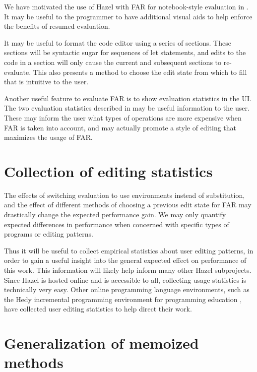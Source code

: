 We have motivated the use of Hazel with FAR for notebook-style evaluation in . It may be useful to the programmer to have additional visual aids to help enforce the benefits of resumed evaluation.

It may be useful to format the code editor using a series of sections. These sections will be syntactic sugar for sequences of let statements, and edits to the code in a section will only cause the current and subsequent sections to re-evaluate. This also presents a method to choose the edit state from which to fill that is intuitive to the user.

Another useful feature to evaluate FAR is to show evaluation statistics in the UI. The two evaluation statistics described in  may be useful information to the user. These may inform the user what types of operations are more expensive when FAR is taken into account, and may actually promote a style of editing that maximizes the usage of FAR.

\section{Collection of editing statistics}
\label{sec:collect-edit-statistics}

The effects of switching evaluation to use environments instead of substitution, and the effect of different methods of choosing a previous edit state for FAR may drastically change the expected performance gain. We may only quantify expected differences in performance when concerned with specific types of programs or editing patterns.

Thus it will be useful to collect empirical statistics about user editing patterns, in order to gain a useful insight into the general expected effect on performance of this work. This information will likely help inform many other Hazel subprojects. Since Hazel is hosted online and is accessible to all, collecting usage statistics is technically very easy. Other online programming language environments, such as the Hedy incremental programming environment for programming education \cite{hermans2020hedy,gilsing2021gradual}, have collected user editing statistics to help direct their work.

\section{Generalization of memoized methods}
\label{sec:generalized-memoization}

